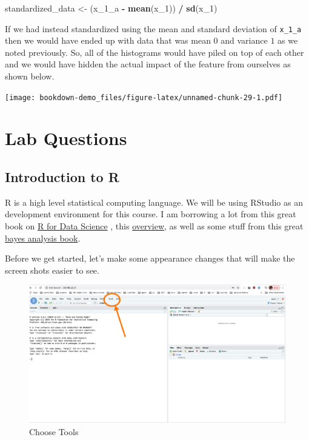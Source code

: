 \documentclass[]{book}
\newenvironment{Shaded}{\begin{snugshade}}{\end{snugshade}}
\newcommand{\DecValTok}[1]{\textcolor[rgb]{0.00,0.00,0.81}{#1}}
\newcommand{\KeywordTok}[1]{\textcolor[rgb]{0.13,0.29,0.53}{\textbf{#1}}}
\newcommand{\NormalTok}[1]{#1}
\newcommand{\OperatorTok}[1]{\textcolor[rgb]{0.81,0.36,0.00}{\textbf{#1}}}
\newcommand{\StringTok}[1]{\textcolor[rgb]{0.31,0.60,0.02}{#1}}
\begin{document}
\begin{Shaded}
\begin{Highlighting}[]
\NormalTok{standardized_data <-}\StringTok{ }\NormalTok{(x_}\DecValTok{1}\NormalTok{_a }\OperatorTok{-}\StringTok{ }\KeywordTok{mean}\NormalTok{(x_}\DecValTok{1}\NormalTok{)) }\OperatorTok{/}\StringTok{ }\KeywordTok{sd}\NormalTok{(x_}\DecValTok{1}\NormalTok{)}
\end{Highlighting}
\end{Shaded}

If we had instead standardized using the mean and standard deviation of \texttt{x\_1\_a} then we would have ended up with data that was mean \(0\) and variance \(1\) as we noted previously. So, all of the histograms would have piled on top of each other and we would have hidden the actual impact of the feature from ourselves as shown below.

\texttt{[image: bookdown-demo\_files/figure-latex/unnamed-chunk-29-1.pdf]}

\hypertarget{lab-questions}{%
\section{Lab Questions}\label{lab-questions}}

\hypertarget{introduction-to-r}{%
\subsection{Introduction to R}\label{introduction-to-r}}

R is a high level statistical computing language. We will be using RStudio as an development environment for this course. I am borrowing a lot from this great book on \href{https://r4ds.had.co.nz/index.html}{R for Data Science} , this \href{https://github.com/CerebralMastication/r_for_the_student}{overview}, as well as some stuff from this great \href{https://bookdown.org/content/3686/the-r-programming-language.html}{bayes analysis book}.

Before we get started, let's make some appearance changes that will make the screen shots easier to see.

\begin{figure}
\centering
\includegraphics{./pics/lab1_ss1.png}
\caption{Choose Tools}
\end{figure}
\end{document}
